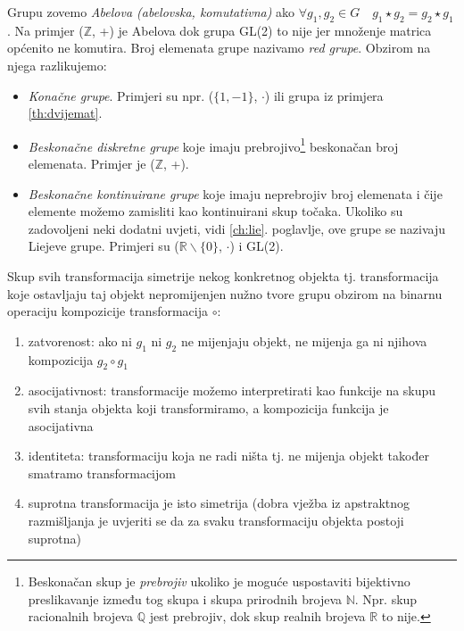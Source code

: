 Grupu zovemo \emph{Abelova (abelovska, komutativna)} ako 
$\forall g_1, g_2 \in G \quad g_1 \star g_2 = g_2 \star g_1$.
Na primjer ($\mathbb{Z}$, +) je Abelova dok grupa GL(2) to nije jer množenje
matrica općenito ne komutira.
Broj elemenata grupe nazivamo \emph{red grupe}. Obzirom na njega razlikujemo:
\begin{itemize}
\item \emph{Konačne grupe}. Primjeri su npr. ($\{1,-1\}$, $\cdot$) ili
    grupa iz primjera \ref{th:dvijemat}.
\item \emph{Beskonačne diskretne grupe} koje imaju 
prebrojivo\footnote{Beskonačan skup je \emph{prebrojiv} ukoliko je moguće uspostaviti
bijektivno preslikavanje između tog skupa i skupa prirodnih brojeva $\mathbb{N}$. Npr. skup
racionalnih brojeva $\mathbb{Q}$ jest prebrojiv, dok skup realnih brojeva
$\mathbb{R}$ to nije.}
beskonačan broj elemenata. Primjer je ($\mathbb{Z}$, +).
\item \emph{Beskonačne kontinuirane grupe} 
koje imaju neprebrojiv broj elemenata i čije elemente možemo
zamisliti kao kontinuirani skup točaka. Ukoliko su zadovoljeni neki dodatni
uvjeti, vidi \ref{ch:lie}. poglavlje, ove grupe se nazivaju Liejeve grupe. 
Primjeri su ($\mathbb{R}\backslash\{0\}$, $\cdot$) i GL(2).
\end{itemize}

\begin{primjer}
Skup svih transformacija simetrije nekog konkretnog objekta tj. transformacija koje ostavljaju
taj objekt nepromijenjen nužno tvore grupu obzirom na binarnu
operaciju kompozicije transformacija $\circ$:
\begin{enumerate}
\item zatvorenost: ako ni $g_1$ ni $g_2$ ne mijenjaju objekt, ne mijenja
   ga ni njihova kompozicija $g_2 \circ g_1$
\item asocijativnost: transformacije možemo interpretirati kao
    funkcije na skupu svih stanja objekta koji transformiramo, a kompozicija funkcija je asocijativna
\item identiteta: transformaciju koja ne radi ništa tj. ne mijenja objekt
      također smatramo transformacijom
\item suprotna transformacija je isto simetrija (dobra vježba iz apstraktnog
    razmišljanja je uvjeriti se da za svaku transformaciju objekta postoji suprotna)
\end{enumerate}
\end{primjer}

